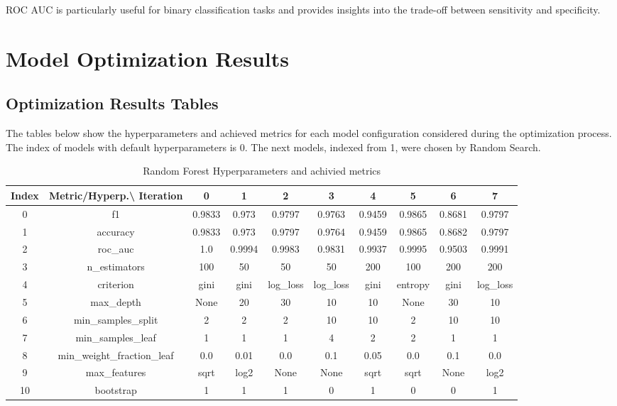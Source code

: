 \documentclass{article}%
\begin{document}
                ROC AUC is particularly useful for binary classification tasks and provides insights into the trade-off between sensitivity and specificity.
                

%
\newpage%
\section{Model Optimization Results}%
\label{sec:ModelOptimizationResults}%
\subsection{Optimization Results Tables}%
\label{subsec:OptimizationResultsTables}%
The tables below show the hyperparameters and achieved metrics for each model configuration considered during the optimization process. The index of models with default hyperparameters is 0. The next models, indexed from 1, were chosen by Random Search.%


\begin{table}[h!]%
\caption{Random Forest Hyperparameters and achivied metrics}%
\vspace{0.2cm}%
\centering%
\begin{tabular}{|c||c||c||c||c||c||c||c||c||c|}%
\hline%
Index&Metric/Hyperp.\textbackslash{} Iteration&0&1&2&3&4&5&6&7\\%
\hline%
0&f1&0.9833&0.973&0.9797&0.9763&0.9459&0.9865&0.8681&0.9797\\%
1&accuracy&0.9833&0.973&0.9797&0.9764&0.9459&0.9865&0.8682&0.9797\\%
2&roc\_auc&1.0&0.9994&0.9983&0.9831&0.9937&0.9995&0.9503&0.9991\\%
3&n\_estimators&100&50&50&50&200&100&200&200\\%
4&criterion&gini&gini&log\_loss&log\_loss&gini&entropy&gini&log\_loss\\%
5&max\_depth&None&20&30&10&10&None&30&10\\%
6&min\_samples\_split&2&2&2&10&10&2&10&10\\%
7&min\_samples\_leaf&1&1&1&4&2&2&1&1\\%
8&min\_weight\_fraction\_leaf&0.0&0.01&0.0&0.1&0.05&0.0&0.1&0.0\\%
9&max\_features&sqrt&log2&None&None&sqrt&sqrt&None&log2\\%
10&bootstrap&1&1&1&0&1&0&0&1\\%
\hline%
\end{tabular}%
\end{table}
\end{document}

